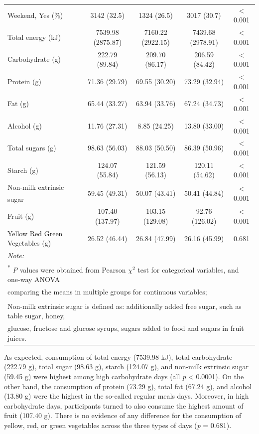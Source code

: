 \begin{table}
\begin{tabular}[t]{lcccc}
		\hspace{1em}Weekend, Yes (\%) & 3142 (32.5) & 1324 (26.5) & 3017 (30.7) & < 0.001\\
		Total energy (kJ) & 7539.98 (2875.87) & 7160.22 (2922.15) & 7439.68 (2978.91) & < 0.001\\
		Carbohydrate (g) & 222.79 (89.84) & 209.70 (86.17) & 206.59 (84.42) & < 0.001\\
		Protein (g) & 71.36 (29.79) & 69.55 (30.20) & 73.29 (32.94) & < 0.001\\
		Fat (g) & 65.44 (33.27) & 63.94 (33.76) & 67.24 (34.73) & < 0.001\\
		Alcohol (g) & 11.76 (27.31) & 8.85 (24.25) & 13.80 (33.00) & < 0.001\\
		Total sugars (g) & 98.63 (56.03) & 88.03 (50.50) & 86.39 (50.96) & < 0.001\\
		Starch (g) & 124.07 (55.84) & 121.59 (56.13) & 120.11 (54.62) & < 0.001\\
		Non-milk extrinsic sugar\textsuperscript{\dag} & 59.45 (49.31) & 50.07 (43.41) & 50.41 (44.84) & < 0.001\\
		Fruit (g) & 107.40 (137.97) & 103.15 (129.08) & 92.76 (126.02) & < 0.001\\
		Yellow Red Green Vegetables (g) & 26.52 (46.44) & 26.84 (47.99) & 26.16 (45.99) & 0.681\\
		\bottomrule
		\multicolumn{5}{l}{\textit{Note: }}\\
		\multicolumn{5}{l}{\textsuperscript{*} \textit{P} values were obtained from Pearson $\chi^2$ test for categorical variables, and one-way ANOVA }\\
		\multicolumn{5}{l}{comparing the means in multiple groups for continuous variables;}\\
		\multicolumn{5}{l}{\textsuperscript{\dag} Non-milk extrinsic sugar is defined as: additionally added free sugar, such as table sugar, honey,}\\ 
		\multicolumn{5}{l}{ glucose, fructose and glucose syrups, sugars added to food and sugars in fruit juices.}\\
	\end{tabular}
\end{table}


As expected, consumption of total energy (7539.98 kJ), total carbohydrate (222.79 g), total sugar (98.63 g), starch (124.07 g), and non-milk extrinsic sugar (59.45 g) were highest among high carbohydrate days (all \textit{p} < 0.0001). On the other hand, the consumption of protein (73.29 g), total fat (67.24 g), and alcohol (13.80 g) were the highest in the so-called regular meals days. Moreover, in high carbohydrate days, participants turned to also consume the highest amount of fruit (107.40 g). There is no evidence of any difference for the consumption of yellow, red, or green vegetables across the three types of days (\textit{p} = 0.681).

